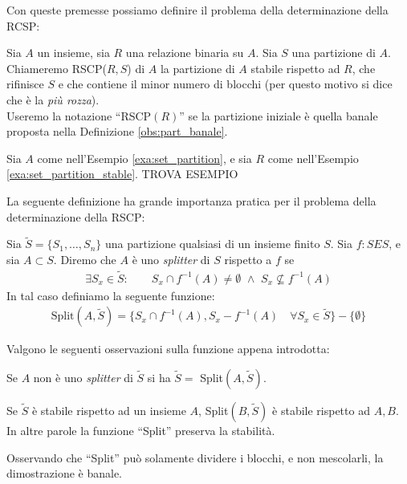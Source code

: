 Con queste premesse possiamo definire il problema della determinazione della RCSP:
\begin{definition}
    Sia $A$ un insieme, sia $R$ una relazione binaria su $A$. Sia $S$ una partizione di $A$. Chiameremo RSCP($R,S$) di $A$ la partizione di $A$ stabile rispetto ad $R$, che rifinisce $S$ e che contiene il minor numero di blocchi (per questo motivo si dice che è la \emph{più rozza}).\\
    Useremo la notazione ``RSCP$(R)$'' se la partizione iniziale è quella banale proposta nella Definizione \ref{obs:part_banale}.
\end{definition}
\begin{example}
    Sia $A$ come nell'Esempio \ref{exa:set_partition}, e sia $R$ come nell'Esempio \ref{exa:set_partition_stable}. TROVA ESEMPIO
\end{example}
La seguente definizione ha grande importanza pratica per il problema della determinazione della RSCP:
\begin{definition}
    \label{def:funz_split}
    Sia $\widetilde{S} = \{S_1,\dots,S_n\}$ una partizione qualsiasi di un insieme finito $S$. Sia $f: S E S$, e sia $A \subset S$. Diremo che $A$ è uno \emph{splitter} di $S$ rispetto a $f$ se
    \begin{gather*}
        \exists S_x \in \widetilde{S} : \qquad S_x \cap f^{-1}(A) \neq \emptyset \,\,\land\,\, S_x \not\subseteq f^{-1}(A)
    \end{gather*}
    In tal caso definiamo la seguente funzione:
    \begin{gather*}
        \text{Split}(A,\widetilde{S}) = \{S_x \cap f^{-1}(A), S_x - f^{-1}(A) \quad \forall S_x \in \widetilde{S}\} - \{\emptyset\}
    \end{gather*}
\end{definition}
Valgono le seguenti osservazioni sulla funzione appena introdotta:
\begin{observation}
    Se $A$ non è uno \emph{splitter} di $\widetilde{S}$ si ha $\widetilde{S} = $ Split$(A,\widetilde{S})$.
\end{observation}
\begin{observation}
    \label{obs:split_eredita}
    Se $\widetilde{S}$ è stabile rispetto ad un insieme $A$, Split$(B,\widetilde{S})$ è stabile rispetto ad $A,B$. In altre parole la funzione ``Split'' preserva la stabilità.
\end{observation}
\begin{proof2}
    Osservando che ``Split'' può solamente dividere i blocchi, e non mescolarli, la dimostrazione è banale.
\end{proof2}
